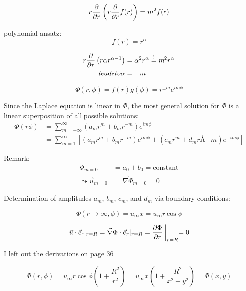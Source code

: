 \begin{equation}
r\frac{\partial }{\partial r}\left(r\frac{\partial }{\partial r}f(r)\right) = m^2f(r)
\end{equation}

polynomial ansatz:
\begin{equation}
f(r) = r^\alpha
\end{equation}

\begin{align}
r\frac{\partial }{\partial r}\left(r\alpha r^{\alpha-1}\right) &= \alpha^2 r^\alpha \overset{!}{=} m^2 r^\alpha\\
leadsto
\alpha &= \pm m
\end{align}

\begin{equation}
\Phi(r,\phi) = f(r)g(\phi) = r^{\pm m}e^{im\phi}
\end{equation}

Since the Laplace equation is linear in $\Phi$, the most general solution for $\Phi$ is a linear superposition of all possible solutions:
\begin{align}
\Phi(r\phi) &= \sum_{m=-\infty}^\infty \left(a_m r^m + b_m r^{-m}\right) e^{im\phi} \\
&= \sum_{m=1}^{\infty} \left[ \left(a_m r^m + b_m r^{-m}\right)e^{im\phi} + \left(c_m r^m + d_m rÅ {-m}\right) e^{-im\phi}\right]
\end{align}

Remark:
\begin{align}
\Phi_{m=0} &= a_0+b_0 = \mathrm{constant} \\
\leadsto
\vec{u}_{m=0} &= \vec{\nabla}\Phi_{m=0}=0
\end{align}

Determination of amplitudes $a_m$, $b_m$, $c_m$, and $d_m$ via boundary conditions:

\begin{equation}
\Phi(r\rightarrow\infty, \phi) = u_\infty x = u_\infty r\cos\phi
\end{equation}

\begin{equation}
\vec{u}\cdot \vec{e}_r |_{r=R} = \vec{\nabla}\Phi\cdot\vec{e}_r|_{r=R} = \frac{\partial \Phi}{\partial r}\biggm\vert_{r=R}=0
\end{equation}

\begin{shaded}
I left out the derivations on page 36
\end{shaded}

\begin{equation}
\Phi(r,\phi) = u_\infty r \cos \phi \left(1+\frac{R^2}{r^2}\right) = u_\infty x \left(1+\frac{R^2}{x^2+y^2}\right) = \Phi(x,y)
\end{equation}



